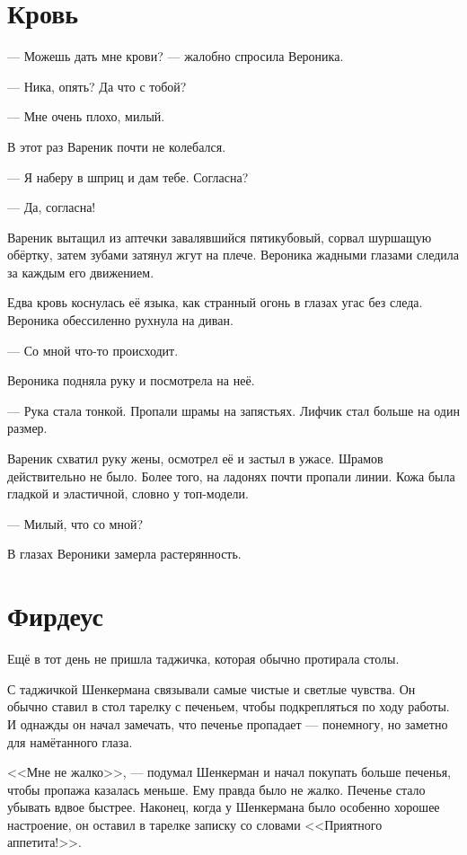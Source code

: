 \documentclass[a4paper,10pt,fleqn]{book}\usepackage{polyglossia}\setdefaultlanguage{english}\setotherlanguage{russian}\defaultfontfeatures{Ligatures=TeX,Mapping=tex-text} \usepackage{xcolor}\definecolor{lightgray}{HTML}{bbbbbb}\color{lightgray}\newcommand{\ml}[3]{\textcolor{black}{#3}}
\begin{document}
\section{Кровь}

--- Можешь дать мне крови? --- жалобно спросила Вероника.

--- Ника, опять?
Да что с тобой?

--- Мне очень плохо, милый.

В этот раз Вареник почти не колебался.

--- Я наберу в шприц и дам тебе.
Согласна?

--- Да, согласна!

Вареник вытащил из аптечки завалявшийся пятикубовый, сорвал шуршащую обёртку, затем зубами затянул жгут на плече.
Вероника жадными глазами следила за каждым его движением.

Едва кровь коснулась её языка, как странный огонь в глазах угас без следа.
Вероника обессиленно рухнула на диван.

--- Со мной что-то происходит.

Вероника подняла руку и посмотрела на неё.

--- Рука стала тонкой.
Пропали шрамы на запястьях.
Лифчик стал больше на один размер.

Вареник схватил руку жены, осмотрел её и застыл в ужасе.
Шрамов действительно не было.
Более того, на ладонях почти пропали линии.
Кожа была гладкой и эластичной, словно у топ-модели.

--- Милый, что со мной?

В глазах Вероники замерла растерянность.

\section{Фирдеус}

Ещё в тот день не пришла таджичка, которая обычно протирала столы.

С таджичкой Шенкермана связывали самые чистые и светлые чувства.
Он обычно ставил в стол тарелку с печеньем, чтобы подкрепляться по ходу работы.
И однажды он начал замечать, что печенье пропадает --- понемногу, но заметно для намётанного глаза.

<<Мне не жалко>>, --- подумал Шенкерман и начал покупать больше печенья, чтобы пропажа казалась меньше.
Ему правда было не жалко.
Печенье стало убывать вдвое быстрее.
Наконец, когда у Шенкермана было особенно хорошее настроение, он оставил в тарелке записку со словами <<Приятного аппетита!>>.
\end{document}
